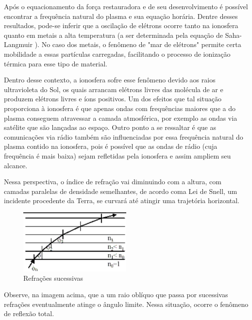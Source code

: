 \documentclass[
	article,
	11pt,
	oneside,
	a4paper,
	english,
	brazil,
	sumario=tradicional
	]{abntex2}
\begin{document}
Após o equacionamento da força restauradora e de seu desenvolvimento é possível encontrar a frequência natural do plasma e sua equação horária. Dentre desses resultados, pode-se inferir que a oscilação de elétrons ocorre tanto na ionosfera quanto em metais a alta temperatura (a ser determinada pela equação de Saha-Langmuir \cite{dresser_1968}). No caso dos metais, o fenômeno de "mar de elétrons" permite certa mobilidade a essas partículas carregadas, facilitando o processo de ionização térmica para esse tipo de material.

Dentro desse contexto, a ionosfera sofre esse fenômeno devido aos raios ultravioleta do Sol, os quais arrancam elétrons livres das molécula de ar e produzem elétrons livres e íons positivos. Um dos efeitos que tal situação proporciona à ionosfera é que apenas ondas com frequências maiores que a do plasma conseguem atravessar a camada atmosférica, por exemplo as ondas via satélite que são lançadas ao espaço. Outro ponto a se ressaltar é que as comunicações via rádio também são influenciadas por essa frequência natural do plasma contido na ionosfera, pois é possível que as ondas de rádio (cuja frequência é mais baixa) sejam refletidas pela ionosfera e assim ampliem seu alcance.

Nessa perspectiva, o índice de refração vai diminuindo com a altura, com camadas paralelas de densidade semelhantes, de acordo coma Lei de Snell, um incidente procedente da Terra, se curvará até atingir uma trajetória horizontal.

\begin{figure}[htb]
    \caption{\label{refracao}Refrações sucessivas}
    \centering
    \includegraphics[width=0.5\textwidth]{refracao.png}
\end{figure}

 Observe, na imagem acima, que a um raio oblíquo que passa por sucessivas refrações eventualmente atinge o ângulo limite. Nessa situação, ocorre o fenômeno de reflexão total.
\end{document}
